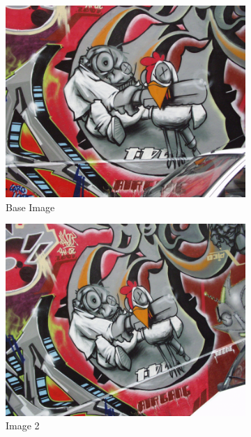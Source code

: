 \documentclass[12pt]{article}
\begin{document}
\begin{figure}[H]
    \centering
    \begin{subfigure}{0.45\textwidth}
        \centering
        \includegraphics[height=0.75\textwidth]{images/img1.png}
        \caption{Base Image}
        \label{graffiti-1}
    \end{subfigure}
    \begin{subfigure}{0.45\textwidth}
        \centering
        \includegraphics[height=0.75\textwidth]{images/img2.png}
        \caption{Image 2}
        \label{graffiti-2}
    \end{subfigure}
    \begin{subfigure}{0.45\textwidth}
        \centering

\end{subfigure}
\end{figure}
\end{document}
